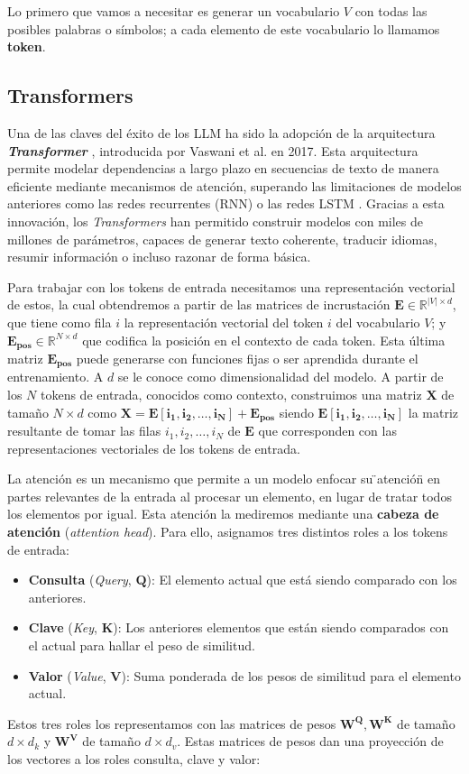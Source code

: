 \documentclass[12pt,twoside]{article}
\newcommand{\abs}[1]{\ensuremath{|#1|}}
\begin{document}
Lo primero que vamos a necesitar es generar un vocabulario $V$ con todas las posibles palabras o símbolos; a cada elemento de este vocabulario lo llamamos \textbf{token}.

\subsection{Transformers}
Una de las claves del éxito de los LLM ha sido la adopción de la arquitectura \textbf{\textit{Transformer}} \cite{transformer}, introducida por Vaswani et al. en 2017. Esta arquitectura permite modelar dependencias a largo plazo en secuencias de texto de manera eficiente mediante mecanismos de atención, superando las limitaciones de modelos anteriores como las redes recurrentes (RNN) o las redes LSTM \cite{LSTM}. Gracias a esta innovación, los \textit{Transformers} han permitido construir modelos con miles de millones de parámetros, capaces de generar texto coherente, traducir idiomas, resumir información o incluso razonar de forma básica.

Para trabajar con los tokens de entrada necesitamos una representación vectorial de estos, la cual obtendremos a partir de las matrices de incrustación $\mathbf{E}\in\mathbb{R}^{\abs{V}\times d}$, que tiene como fila $i$ la representación vectorial del token $i$ del vocabulario $V$; y $\mathbf{E_{pos}}\in\mathbb{R}^{N\times d}$ que codifica la posición en el contexto de cada token. Esta última matriz $\mathbf{E_{pos}}$ puede generarse con funciones fijas o ser aprendida durante el entrenamiento. A $d$ se le conoce como dimensionalidad del modelo. A partir de los $N$ tokens de entrada, conocidos como contexto, construimos una matriz $\mathbf{X}$ de tamaño $N\times d$ como $\mathbf{X=E[i_1,i_2,\dots,i_N]+E_{pos}}$ siendo $\mathbf{E[i_1,i_2,\dots,i_N]}$ la matriz resultante de tomar las filas $i_1,i_2,\dots,i_N$ de $\mathbf{E}$ que corresponden con las representaciones vectoriales de los tokens de entrada.

La atención es un mecanismo que permite a un modelo enfocar su \"{}atención\"{} en partes relevantes de la entrada al procesar un elemento, en lugar de tratar todos los elementos por igual. Esta atención la mediremos mediante una \textbf{cabeza de atención} (\textit{attention head}). Para ello, asignamos tres distintos roles a los tokens de entrada:
\begin{itemize}
    \item \textbf{Consulta} (\textit{Query}, $\mathbf{Q}$): El elemento actual que está siendo comparado con los anteriores.
    \item \textbf{Clave} (\textit{Key}, $\mathbf{K}$): Los anteriores elementos que están siendo comparados con el actual para hallar el peso de similitud.
    \item \textbf{Valor} (\textit{Value}, $\mathbf{V}$): Suma ponderada de los pesos de similitud para el elemento actual.
\end{itemize}
Estos tres roles los representamos con las matrices de pesos $\mathbf{W^{Q}}, \mathbf{W^{K}}$ de tamaño $d\times d_k$ y $\mathbf{W^{V}}$ de tamaño $d\times d_v$. Estas matrices de pesos dan una proyección de los vectores a los roles consulta, clave y valor:
\end{document}
